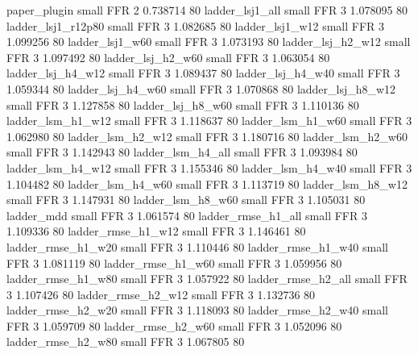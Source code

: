             paper_plugin      small      FFR                 2 0.738714 80
         ladder_lsj1_all      small      FFR                 3 1.078095 80
      ladder_lsj1_r12p80      small      FFR                 3 1.082685 80
         ladder_lsj1_w12      small      FFR                 3 1.099256 80
         ladder_lsj1_w60      small      FFR                 3 1.073193 80
       ladder_lsj_h2_w12      small      FFR                 3 1.097492 80
       ladder_lsj_h2_w60      small      FFR                 3 1.063054 80
       ladder_lsj_h4_w12      small      FFR                 3 1.089437 80
       ladder_lsj_h4_w40      small      FFR                 3 1.059344 80
       ladder_lsj_h4_w60      small      FFR                 3 1.070868 80
       ladder_lsj_h8_w12      small      FFR                 3 1.127858 80
       ladder_lsj_h8_w60      small      FFR                 3 1.110136 80
       ladder_lsm_h1_w12      small      FFR                 3 1.118637 80
       ladder_lsm_h1_w60      small      FFR                 3 1.062980 80
       ladder_lsm_h2_w12      small      FFR                 3 1.180716 80
       ladder_lsm_h2_w60      small      FFR                 3 1.142943 80
       ladder_lsm_h4_all      small      FFR                 3 1.093984 80
       ladder_lsm_h4_w12      small      FFR                 3 1.155346 80
       ladder_lsm_h4_w40      small      FFR                 3 1.104482 80
       ladder_lsm_h4_w60      small      FFR                 3 1.113719 80
       ladder_lsm_h8_w12      small      FFR                 3 1.147931 80
       ladder_lsm_h8_w60      small      FFR                 3 1.105031 80
              ladder_mdd      small      FFR                 3 1.061574 80
      ladder_rmse_h1_all      small      FFR                 3 1.109336 80
      ladder_rmse_h1_w12      small      FFR                 3 1.146461 80
      ladder_rmse_h1_w20      small      FFR                 3 1.110446 80
      ladder_rmse_h1_w40      small      FFR                 3 1.081119 80
      ladder_rmse_h1_w60      small      FFR                 3 1.059956 80
      ladder_rmse_h1_w80      small      FFR                 3 1.057922 80
      ladder_rmse_h2_all      small      FFR                 3 1.107426 80
      ladder_rmse_h2_w12      small      FFR                 3 1.132736 80
      ladder_rmse_h2_w20      small      FFR                 3 1.118093 80
      ladder_rmse_h2_w40      small      FFR                 3 1.059709 80
      ladder_rmse_h2_w60      small      FFR                 3 1.052096 80
      ladder_rmse_h2_w80      small      FFR                 3 1.067805 80
